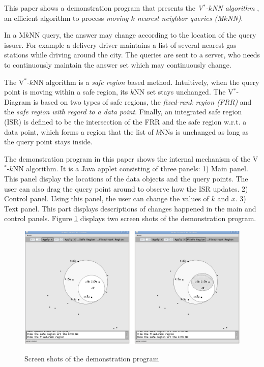 \documentclass[paper=a4, fontsize=18pt]{article} %
\numberwithin{equation}{section} %
\numberwithin{figure}{section} %
\numberwithin{table}{section} %
\begin{document}
This paper shows a demonstration program that presents the \emph{V$^*$-$k$NN algorithm} \cite{NZTK08}, an efficient algorithm to process \emph{moving $k$ nearest neighbor queries (M$k$NN)}.

In a M$k$NN query, the answer may change according to the location of the query issuer. For example a delivery driver maintains a list of several nearest gas stations while driving around the city. The queries are sent to a server, who needs to continuously maintain the answer set which may continuously change.

The V$^*$-$k$NN algorithm is a \emph{safe region} based method. Intuitively, when the query point is moving within a safe region, its $k$NN set stays unchanged. The V$^*$-Diagram is based on two types of safe regions, the \emph{fixed-rank region (FRR)} and the \emph{safe region with regard to a data point}. Finally, an integrated safe region (ISR) is defined to be the intersection of the FRR and the safe region w.r.t. a data point, which forms a region that the list of $k$NNs is unchanged as long as the query point stays inside.

The demonstration program in this paper shows the internal mechanism of the V$^*$-$k$NN algorithm. It is a Java applet consisting of three panels: 1) Main panel. This panel display the locations of the data objects and the query points. The user can also drag the query point around to observe how the ISR updates. 2) Control panel. Using this panel, the user can change the values of $k$ and $x$. 3) Text panel. This part displays descriptions of changes happened in the main and control panels. Figure \ref{fig:VkNN_demo} displays two screen shots of the demonstration program.

\begin{figure}[h]
  \centering
  \includegraphics[width=\linewidth]{8_29_VkNN_demo.png}\\
  \caption{Screen shots of the demonstration program}\label{fig:VkNN_demo}
\end{figure}
\end{document}
